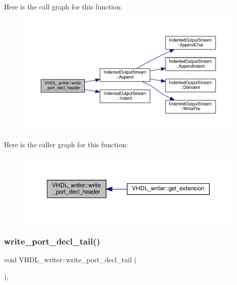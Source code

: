Here is the call graph for this function\+:
\nopagebreak
\begin{figure}[H]
\begin{center}
\leavevmode
\includegraphics[width=350pt]{d0/d0c/structVHDL__writer_a19481913996a5ac739d788aa43f9a2a9_cgraph}
\end{center}
\end{figure}
Here is the caller graph for this function\+:
\nopagebreak
\begin{figure}[H]
\begin{center}
\leavevmode
\includegraphics[width=350pt]{d0/d0c/structVHDL__writer_a19481913996a5ac739d788aa43f9a2a9_icgraph}
\end{center}
\end{figure}
\mbox{\label{structVHDL__writer_af421fa8d57e933193276a0cb76ccd0a3}} 
\subsubsection{\texorpdfstring{write\+\_\+port\+\_\+decl\+\_\+tail()}{write\_port\_decl\_tail()}}
{\footnotesize\ttfamily void V\+H\+D\+L\+\_\+writer\+::write\+\_\+port\+\_\+decl\+\_\+tail (\begin{DoxyParamCaption}{ }\end{DoxyParamCaption})\hspace{0.3cm}{\ttfamily [override]}, {\ttfamily [virtual]}}



